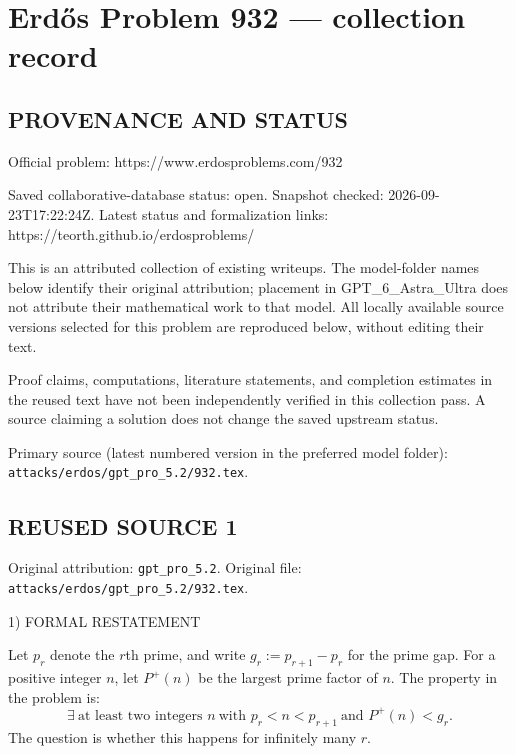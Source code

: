 \section*{Erd\H{o}s Problem 932 --- collection record}

\subsection*{PROVENANCE AND STATUS}
Official problem: https://www.erdosproblems.com/932

Saved collaborative-database status: open.
Snapshot checked: 2026-09-23T17:22:24Z.
Latest status and formalization links: https://teorth.github.io/erdosproblems/

This is an attributed collection of existing writeups. The model-folder names below identify their original attribution; placement in GPT\_6\_Astra\_Ultra does not attribute their mathematical work to that model. All locally available source versions selected for this problem are reproduced below, without editing their text.

Proof claims, computations, literature statements, and completion estimates in the reused text have not been independently verified in this collection pass. A source claiming a solution does not change the saved upstream status.

Primary source (latest numbered version in the preferred model folder): \texttt{attacks/erdos/gpt\_pro\_5.2/932.tex}.

\subsection*{REUSED SOURCE 1}
Original attribution: \texttt{gpt\_pro\_5.2}.
Original file: \texttt{attacks/erdos/gpt\_pro\_5.2/932.tex}.


1) FORMAL RESTATEMENT

Let $p_r$ denote the $r$th prime, and write $g_r:=p_{r+1}-p_r$ for the prime gap.
For a positive integer $n$, let $P^+(n)$ be the largest prime factor of $n$.
The property in the problem is:
\[
\exists\ \text{at least two integers }n\ \text{with }p_r<n<p_{r+1}\ \text{and }P^+(n)<g_r.
\]
The question is whether this happens for infinitely many $r$.

